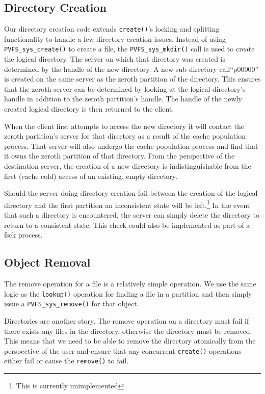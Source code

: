 \documentclass[letterpaper]{article}
\newcommand{\code}[1]{\texttt{#1}}
\begin{document}
\subsection{Directory Creation}
Our directory creation code extends \code{create()}'s locking and splitting
functionality to handle a few directory creation issues.  Instead of using
\code{PVFS\_\-sys\_\-create()} to create a file, the \code{PVFS\_\-sys\_\-mkdir()} call is
used to create the logical directory.  The server on which that directory was
created is determined by the handle of the new directory.  A new sub directory
call``p00000'' is created on the same server as the zeroth partition of the
directory.  This ensures that the zeroth server can be determined by looking
at the logical directory's handle in addition to the zeroth partition's handle.
The handle of the newly created logical directory is then returned to the client.

When the client first attempts to access the new directory it will contact the
zeroth partition's server for that directory as a result of the cache
population process.  That server will also undergo the cache population
process and find that it owns the zeroth partition of that directory.  From
the perspective of the destination server, the creation of a new directory is
indistinguishable from the first (cache cold) access of an existing, empty
directory.

Should the server doing directory creation fail between the creation of the
logical directory and the first partition an inconsistent state will be
left.\footnote{This is currently unimplemented}  In the event that such a
directory is encountered, the server can simply delete the directory to return
to a consistent state.  This check could also be implemented as part of a fsck
process.

\subsection{Object Removal}
The remove operation for a file is a relatively simple operation.  We use the
same logic as the \code{lookup()} operation for finding a file in a partition
and then simply issue a \code{PVFS\_\-sys\_\-remove()} for that object.

Directories are another story.  The remove operation on a directory must fail if
there exists any files in the directory, otherwise the directory must be
removed.  This means that we need to be able to remove the directory
atomically from the perspective of the user and ensure that any concurrent
\code{create()} operations either fail or cause the \code{remove()} to fail.
\end{document}
